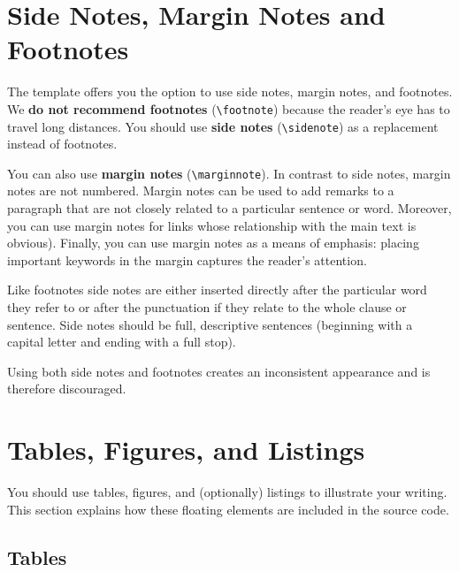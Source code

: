 \section{Side Notes, Margin Notes and Footnotes}

The template offers you the option to use side notes, margin notes, and footnotes. We \textbf{do not recommend footnotes} (\verb|\footnote|) because the reader's eye has to travel long distances. You should use \textbf{side notes} (\verb|\sidenote|) as a replacement instead of footnotes.

You can also use \textbf{margin notes} (\verb|\marginnote|). In contrast to side notes, margin notes are not numbered. Margin notes can be used to add remarks to a paragraph that are not closely related to a particular sentence or word. Moreover, you can use margin notes for links whose relationship with the main text is obvious). Finally, you can use margin notes as a means of emphasis: placing important keywords in the margin captures the reader's attention.

Like footnotes side notes are either inserted directly after the particular word they refer to or after the punctuation if they relate to the whole clause or sentence. Side notes should be full, descriptive sentences (beginning with a capital letter and ending with a full stop).

Using both side notes and footnotes creates an inconsistent appearance and is therefore discouraged.

\section{Tables, Figures, and Listings}
\label{sec:tablesfigureslistings}

You%
should use tables, figures, and (optionally) listings to illustrate your writing. This section explains how these floating elements are included in the source code.

\subsection{Tables}

